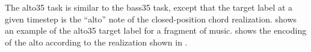
The \gls{alto35} task is similar to the \gls{bass35} task,
except that the target label at a given timestep is the
``alto'' note of the \gls{closed-position} chord
realization.  shows an example of the
\gls{alto35} target label for a fragment of music.
 shows the encoding of the alto according
to the realization shown in .




